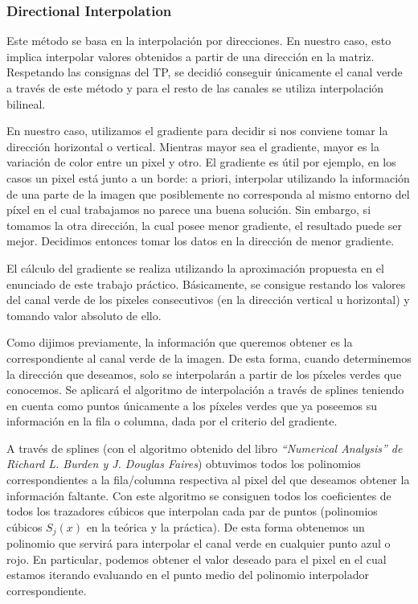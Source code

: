 \subsubsection{Directional Interpolation}

Este método se basa en la interpolación por direcciones. En nuestro caso, esto implica interpolar valores obtenidos a partir de una dirección en la matriz. Respetando las consignas del TP, se decidió conseguir únicamente el canal verde a través de este método y para el resto de las canales se utiliza interpolación bilineal.

\vspace{\baselineskip}

En nuestro caso, utilizamos el gradiente para decidir si nos conviene tomar la dirección horizontal o vertical. Mientras mayor sea el gradiente, mayor es la variación de color entre un pixel y otro. El gradiente es útil por ejemplo, en los casos un pixel está junto a un borde: a priori, interpolar utilizando la información de una parte de la imagen que posiblemente no corresponda al mismo entorno del píxel en el cual trabajamos no parece una buena solución. Sin embargo, si tomamos la otra dirección, la cual posee menor gradiente, el resultado puede ser mejor. Decidimos entonces tomar los datos en la dirección de menor gradiente.

\vspace{\baselineskip}

El cálculo del gradiente se realiza utilizando la aproximación propuesta en el enunciado de este trabajo práctico. Básicamente, se consigue restando los valores del canal verde de los pixeles consecutivos (en la dirección vertical u horizontal) y tomando valor absoluto de ello.

\vspace{\baselineskip}

Como dijimos previamente, la información que queremos obtener es la correspondiente al canal verde de la imagen. De esta forma, cuando determinemos la dirección que deseamos, solo se interpolarán a partir de los píxeles verdes que conocemos. Se aplicará el algoritmo de interpolación a través de splines teniendo en cuenta como puntos únicamente a los píxeles verdes que ya poseemos su información en la fila o columna, dada por el criterio del gradiente.

\vspace{\baselineskip}

A través de splines (con el algoritmo obtenido del libro \textit{``Numerical Analysis'' de Richard L. Burden y J. Douglas Faires}) obtuvimos todos los polinomios correspondientes a la fila/columna respectiva al pixel del que deseamos obtener la información faltante. Con este algoritmo se consiguen todos los coeficientes de todos los trazadores cúbicos que interpolan cada par de puntos (polinomios cúbicos $S_j(x)$ en la teórica y la práctica). De esta forma obtenemos un polinomio que servirá para interpolar el canal verde en cualquier punto azul o rojo. En particular, podemos obtener el valor deseado para el pixel en el cual estamos iterando evaluando en el punto medio del polinomio interpolador correspondiente.

